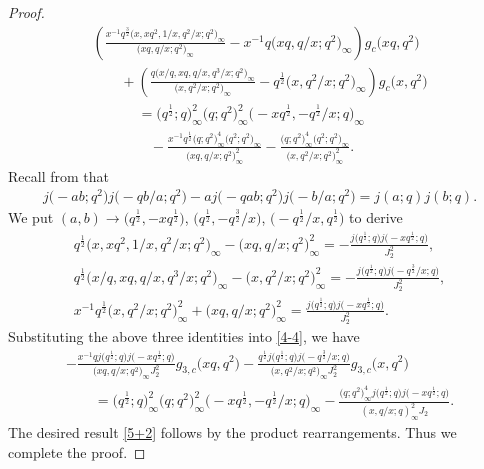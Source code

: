 \documentclass[pdftex]{sigma}
\numberwithin{equation}{section}
\begin{document}
\begin{proof}
\begin{gather}
\left(\frac{x^{-1}q^{\frac{3}{2}}\bigl(x,xq^2,1/x,q^2/x;q^2\bigr)_{\infty}}
{\bigl(xq,q/x;q^2\bigr)_{\infty}}
-x^{-1}q\bigl(xq,q/x;q^2\bigr)_{\infty}\right)g_c\bigl(xq,q^2\bigr)\nonumber\\
\qquad+\left(\frac{q\bigl(x/q,xq,q/x,q^3/x;q^2\bigr)_{\infty}}
{\bigl(x,q^2/x;q^2\bigr)_{\infty}}
-q^{\frac{1}{2}}\bigl(x,q^2/x;q^2\bigr)_{\infty}\right)g_c\bigl(x,q^2\bigr)\nonumber\\
\phantom{\qquad+}{}=\bigl(q^{\frac{1}{2}};q\bigr)_{\infty}^2\bigl(q;q^2\bigr)_{\infty}^2
\bigl(-xq^{\frac{1}{2}},-q^{\frac{1}{2}}/x;q\bigr)_{\infty}\nonumber\\
\phantom{\qquad+=}{}-\frac{x^{-1}q^{\frac{1}{2}}\bigl(q;q^2\bigr)_{\infty}^4\bigl(q^2;q^2\bigr)_{\infty}}
{\bigl(xq,q/x;q^2\bigr)_{\infty}^2}
-\frac{\bigl(q;q^2\bigr)_{\infty}^4\bigl(q^2;q^2\bigr)_{\infty}}{\bigl(x,q^2/x;q^2\bigr)_{\infty}^2}. \label{4-4}
\end{gather}
Recall from \cite[equation~(2.4b)]{HM} that
\begin{align*}
j\bigl(-ab;q^2\bigr)j\bigl(-qb/a;q^2\bigr)-aj\bigl(-qab;q^2\bigr)j\bigl(-b/a;q^2\bigr)=j(a;q)j(b;q).
\end{align*}
We put $(a,b)\rightarrow \bigl(q^{\frac{1}{2}},-xq^{\frac{1}{2}}\bigr)$, $\bigl(q^{\frac{1}{2}},-q^{\frac{3}{2}}/x\bigr)$, $\bigl(-q^{\frac{1}{2}}/x,q^{\frac{1}{2}}\bigr)$ to derive
\begin{gather*}
q^{\frac{1}{2}}\bigl(x,xq^2,1/x,q^2/x;q^2\bigr)_{\infty}
-\bigl(xq,q/x;q^2\bigr)_{\infty}^2
=-\frac{j\bigl(q^{\frac{1}{2}};q\bigr)j\bigl(-xq^{\frac{1}{2}};q\bigr)}{J_2^2},\\
q^{\frac{1}{2}}\bigl(x/q,xq,q/x,q^3/x;q^2\bigr)_{\infty}
-\bigl(x,q^2/x;q^2\bigr)_{\infty}^2
=-\frac{j\bigl(q^{\frac{1}{2}};q\bigr)j\bigl(-q^{\frac{3}{2}}/x;q\bigr)}{J_2^2},\\
x^{-1}q^{\frac{1}{2}}\bigl(x,q^2/x;q^2\bigr)_{\infty}^2
+\bigl(xq,q/x;q^2\bigr)_{\infty}^2
=\frac{j\bigl(q^{\frac{1}{2}};q\bigr)j\bigl(-xq^{\frac{1}{2}};q\bigr)}{J_2^2}.
\end{gather*}
Substituting the above three identities into \eqref{4-4}, we have
\begin{gather*}
-\frac{x^{-1}qj\bigl(q^{\frac{1}{2}};q\bigr)j\bigl(-xq^{\frac{1}{2}};q\bigr)}
{\bigl(xq,q/x;q^2\bigr)_{\infty}J_2^2}g_{3,c}\bigl(xq,q^2\bigr)
-\frac{q^{\frac{1}{2}}j\bigl(q^{\frac{1}{2}};q\bigr)j\bigl(-q^{\frac{3}{2}}/x;q\bigr)}
{\bigl(x,q^2/x;q^2\bigr)_{\infty}J_2^2}g_{3,c}\bigl(x,q^2\bigr)\\
\qquad=\bigl(q^{\frac{1}{2}};q\bigr)_{\infty}^2\bigl(q;q^2\bigr)_{\infty}^2
\bigl(-xq^{\frac{1}{2}},-q^{\frac{1}{2}}/x;q\bigr)_{\infty}
-\frac{\bigl(q;q^2\bigr)_{\infty}^4j\bigl(q^{\frac{1}{2}};q\bigr)j\bigl(-xq^{\frac{1}{2}};q\bigr)}
{(x,q/x;q)_{\infty}^2J_2}.
\end{gather*}
The desired result \eqref{5+2} follows by the product rearrangements. Thus we complete the proof.
\end{proof}
\end{document}
